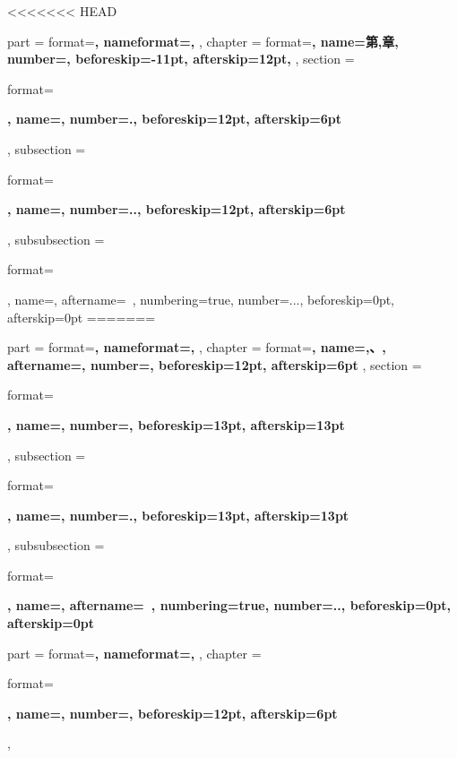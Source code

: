 <<<<<<< HEAD
\ctexset
{
    part =
    {
        format=\centering{}\bfseries,
        nameformat=\centering\heiti\fontsize{48}{48}\bfseries,
    },
    chapter = 
    {
        format=\centering{}\bfseries,
        name={第,章},
        number=,
        beforeskip=-11pt,
        afterskip=12pt,
    },
    section =
    {
        format=\raggedright{}\bfseries,
        name={},
        number=.,
        beforeskip=12pt,
        afterskip=6pt
    },
    subsection =
    {
        format=\raggedright{}\bfseries,
        name={},
        number=..,
        beforeskip=12pt,
        afterskip=6pt
    },
    subsubsection =
    {
        format=\raggedright{},
        name={},
        aftername=~,
        numbering=true,
        number=...,
        beforeskip=0pt,
        afterskip=0pt
=======
{
    \ctexset
    {
        part =
        {
            format=\centering{}\bfseries,
            nameformat=\centering\heiti\fontsize{48}{48}\bfseries,
        },
        chapter =
        {
            format=\centering{}\bfseries,
            name={,、},
            aftername=,
            number=,
            beforeskip=12pt,
            afterskip=6pt
        },
        section =
        {
            format=\raggedright{}\bfseries,
            name={},
            number=,
            beforeskip=13pt,
            afterskip=13pt
        },
        subsection =
        {
            format=\raggedright{}\bfseries,
            name={},
            number=.,
            beforeskip=13pt,
            afterskip=13pt
        },
        subsubsection =
        {
            format=\raggedright{}\bfseries,
            name={},
            aftername=~,
            numbering=true,
            number=..,
            beforeskip=0pt,
            afterskip=0pt
        }
    }
}
{
    \ctexset
    {
        part =
        {
            format=\centering{}\bfseries,
            nameformat=\centering\heiti\fontsize{48}{48}\bfseries,
        },
        chapter =
        {
            format=\raggedright{}\bfseries,
            name={},
            number=,
            beforeskip=12pt,
            afterskip=6pt
        },
}}}}
